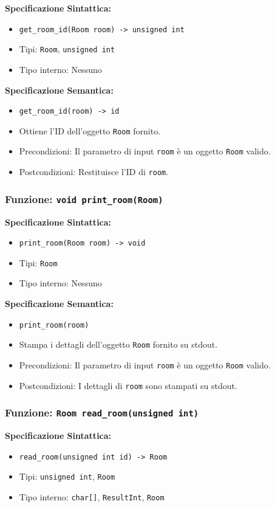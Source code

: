 \documentclass[11pt]{scrartcl} %
\begin{document}
\textbf{Specificazione Sintattica:}
\begin{itemize}
	\item \texttt{get\_room\_id(Room room) -> unsigned int}
	\item Tipi: \texttt{Room}, \texttt{unsigned int}
	\item Tipo interno: Nessuno
\end{itemize}

\textbf{Specificazione Semantica:}
\begin{itemize}
	\item \texttt{get\_room\_id(room) -> id}
	\item Ottiene l'ID dell'oggetto \texttt{Room} fornito.
	\item Precondizioni: Il parametro di input \texttt{room} è un oggetto \texttt{Room} valido.
	\item Postcondizioni: Restituisce l'ID di \texttt{room}.
\end{itemize}

\subsubsection{Funzione: \texttt{void print\_room(Room)}}

\textbf{Specificazione Sintattica:}
\begin{itemize}
	\item \texttt{print\_room(Room room) -> void}
	\item Tipi: \texttt{Room}
	\item Tipo interno: Nessuno
\end{itemize}

\textbf{Specificazione Semantica:}
\begin{itemize}
	\item \texttt{print\_room(room)}
	\item Stampa i dettagli dell'oggetto \texttt{Room} fornito su stdout.
	\item Precondizioni: Il parametro di input \texttt{room} è un oggetto \texttt{Room} valido.
	\item Postcondizioni: I dettagli di \texttt{room} sono stampati su stdout.
\end{itemize}

\subsubsection{Funzione: \texttt{Room read\_room(unsigned int)}}

\textbf{Specificazione Sintattica:}
\begin{itemize}
	\item \texttt{read\_room(unsigned int id) -> Room}
	\item Tipi: \texttt{unsigned int}, \texttt{Room}
	\item Tipo interno: \texttt{char[]}, \texttt{ResultInt}, \texttt{Room}
\end{itemize}
\end{document}
